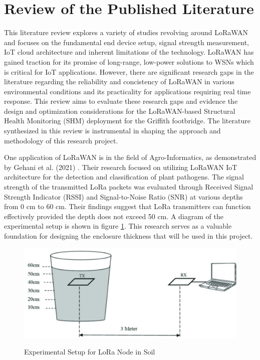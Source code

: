 \section{Review of the Published Literature}
This literature review explores a variety of studies revolving around LoRaWAN and focuses on the fundamental end device setup, signal strength measurement, IoT cloud architecture and inherent limitations of the technology. LoRaWAN has gained traction for its promise of long-range, low-power solutions to WSNs which is critical for IoT applications. However, there are significant research gaps in the literature regarding the reliability and concistency of LoRaWAN in various environmental conditions and its practicality for applications requiring real time response. This review aims to evaluate these research gaps and evidence the design and optimization considerations for the LoRaWAN-based Structural Health Monitoring (SHM) deployment for the Griffith footbridge. The literature synthesized in this review is instrumental in shaping the approach and methodology of this research project. 

One application of LoRaWAN is in the field of Agro-Informatics, as demonstrated by Gehani et al. (2021) \cite{LoRa-Agro-Informatics}. Their research focused on utilizing LoRaWAN IoT architecture for the detection and classification of plant pathogens. The signal strength of the transmitted LoRa packets was evaluated through Received Signal Strength Indicator (RSSI) and Signal-to-Noise Ratio (SNR) at various depths from 0 cm to 60 cm. Their findings suggest that LoRa transmitters can function effectively provided the depth does not exceed 50 cm. A diagram of the experimental setup is shown in figure \ref{lora-bucket}. This research serves as a valuable foundation for designing the enclosure thickness that will be used in this project. 

\begin{figure}[h]
	\centering
	\caption{Experimental Setup for LoRa Node in Soil \cite{LoRa-Agro-Informatics}}
	\includegraphics[scale=0.5]{Sections/Literature-Review/Lora-bucket.pdf}
	\label{lora-bucket}
\end{figure}

